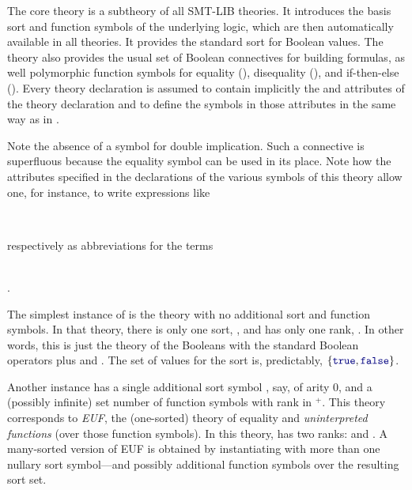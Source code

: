 The core theory is a subtheory of all SMT-LIB theories.
It introduces the basis sort and function symbols of the underlying logic,
which are then automatically available in all theories.
It provides the standard  sort for Boolean values.
The theory also provides the usual set of Boolean connectives for building formulas,
as well polymorphic function symbols for equality (\ter{=}), disequality (), and
if-then-else ().
Every theory declaration is assumed 
to contain implicitly the  and  attributes 
of the  theory declaration and 
to define the symbols in those attributes in the same way as in .




Note the absence of a symbol for double implication.
Such a connective is superfluous 
because the equality symbol \ter{=} can be used in its place. 
Note how the attributes specified in the declarations of the various symbols
of this theory allow one, for instance, to write expressions like 

\begin{center}
\qquad {}
\qquad {} \\
\end{center}

\noindent respectively as abbreviations for the terms

\begin{center}
\qquad {}
\qquad {} \\
\qquad {} .
\end{center}


The simplest instance of  is the theory with no additional sort
and function symbols.
In that theory, there is only one sort, ,
and  has only one rank, .
In other words, this is just the theory of the Booleans with the standard Boolean operators
plus  and .
The set of values for the  sort is, predictably, $\{\ter{true},\ter{false}\}$.

Another instance has a single additional sort symbol , say, 
of arity 0, and a (possibly infinite) set number of function symbols 
with rank in $\!^+$.
This theory corresponds to \emph{EUF}, 
the (one-sorted) theory of equality and \emph{uninterpreted functions}
(over those function symbols).
In this theory,  has two ranks:
 and .
A many-sorted version of EUF is obtained by instantiating 
with more than one nullary sort symbol---and possibly additional
function symbols over the resulting sort set. 

